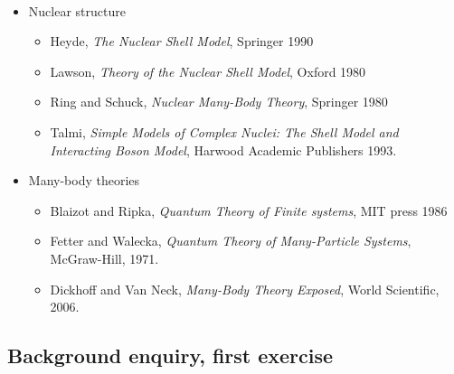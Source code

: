 \documentclass[%
oneside,                 %
final,                   %
10pt]{article}
\begin{document}
\paragraph{}
\begin{itemize}
\item Nuclear structure
\begin{itemize}

 \item Heyde, \emph{The Nuclear Shell Model}, Springer 1990

 \item Lawson, \emph{Theory of the Nuclear Shell Model}, Oxford 1980

 \item Ring and Schuck, \emph{Nuclear Many-Body Theory}, Springer 1980

 \item Talmi, \emph{Simple Models of Complex Nuclei: The Shell Model and Interacting Boson Model}, Harwood Academic Publishers 1993.

\end{itemize}

\noindent
\item Many-body theories
\begin{itemize}

 \item Blaizot and Ripka, \emph{Quantum Theory of Finite systems}, MIT press 1986

 \item Fetter and Walecka, \emph{Quantum Theory of Many-Particle Systems}, McGraw-Hill, 1971.

 \item Dickhoff and Van Neck, \emph{Many-Body Theory Exposed}, World Scientific, 2006.
\end{itemize}

\noindent
\end{itemize}

\noindent








\subsection{Background enquiry, first exercise}

\end{document}
